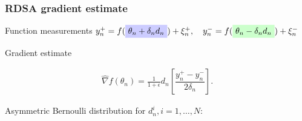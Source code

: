 \begin{frame}
\begin{small}
\frametitle{\centering  RDSA gradient estimate}

\begin{block}{\alert{Function measurements}}
$y_{n}^+ = f(\tikz[baseline]{\node[fill=blue!20,anchor=base] (tL) {$\theta_n+\delta_n d_n$};} ) + \xi_{n}^+,\quad y_{n}^- = f(\tikz[baseline]{\node[fill=green!20,anchor=base] (tL1) {$\theta_n-\delta_n d_n$};}) + \xi_{n}^-$
\end{block}

\vspace{1.5ex}

\pause
\begin{block}{\alert{Gradient estimate}}

\begin{align}
\label{eq:grad-unif}
\widehat\nabla f(\theta_n) = \frac{1}{1+\epsilon} d_n \left[ \dfrac{y_n^+ - y_n^-}{2\delta_n}\right].
\end{align}

Asymmetric Bernoulli distribution for $d_n^i, i=1,\ldots,N$:\\[1ex]
\begin{center}
 \end{center}

 
\end{block}
\end{small}
\end{frame}


